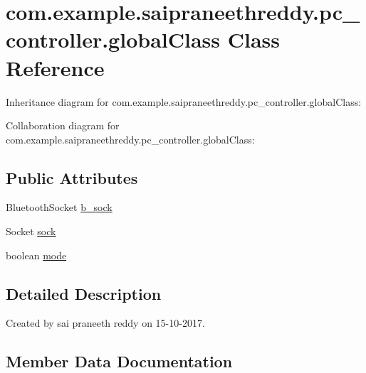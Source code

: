 \hypertarget{classcom_1_1example_1_1saipraneethreddy_1_1pc__controller_1_1globalClass}{}\section{com.\+example.\+saipraneethreddy.\+pc\+\_\+controller.\+global\+Class Class Reference}
\label{classcom_1_1example_1_1saipraneethreddy_1_1pc__controller_1_1globalClass}


Inheritance diagram for com.\+example.\+saipraneethreddy.\+pc\+\_\+controller.\+global\+Class\+:


Collaboration diagram for com.\+example.\+saipraneethreddy.\+pc\+\_\+controller.\+global\+Class\+:
\subsection*{Public Attributes}
\begin{DoxyCompactItemize}
\item 
Bluetooth\+Socket \hyperlink{classcom_1_1example_1_1saipraneethreddy_1_1pc__controller_1_1globalClass_a5afb13e514f941ad944a8e3c56be6046}{b\+\_\+sock}
\item 
Socket \hyperlink{classcom_1_1example_1_1saipraneethreddy_1_1pc__controller_1_1globalClass_af31445d851f57e68b3e3913d60fa0c11}{sock}
\item 
boolean \hyperlink{classcom_1_1example_1_1saipraneethreddy_1_1pc__controller_1_1globalClass_ae3ed7986be302d5623c3d5aeafe67f59}{mode}
\end{DoxyCompactItemize}


\subsection{Detailed Description}
Created by sai praneeth reddy on 15-\/10-\/2017. 

\subsection{Member Data Documentation}
